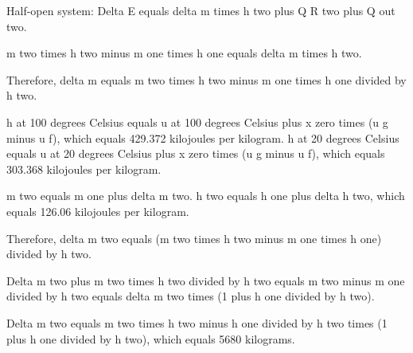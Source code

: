Half-open system:  
Delta E equals delta m times h two plus Q R two plus Q out two.  

m two times h two minus m one times h one equals delta m times h two.  

Therefore, delta m equals m two times h two minus m one times h one divided by h two.  

h at 100 degrees Celsius equals u at 100 degrees Celsius plus x zero times (u g minus u f), which equals 429.372 kilojoules per kilogram.  
h at 20 degrees Celsius equals u at 20 degrees Celsius plus x zero times (u g minus u f), which equals 303.368 kilojoules per kilogram.  

m two equals m one plus delta m two.  
h two equals h one plus delta h two, which equals 126.06 kilojoules per kilogram.  

Therefore, delta m two equals (m two times h two minus m one times h one) divided by h two.  

Delta m two plus m two times h two divided by h two equals m two minus m one divided by h two equals delta m two times (1 plus h one divided by h two).  

Delta m two equals m two times h two minus h one divided by h two times (1 plus h one divided by h two), which equals 5680 kilograms.